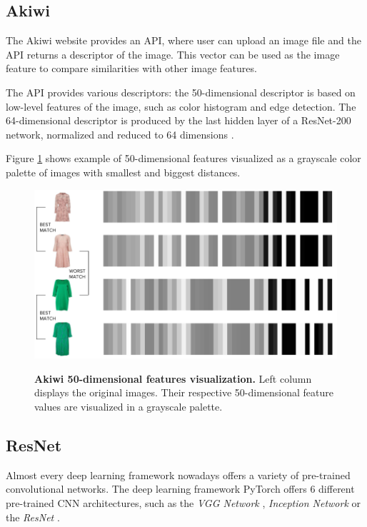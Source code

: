 \documentclass[12pt]{report}
\begin{document}
\subsection{Akiwi}
The Akiwi website \cite{sonnenberg_akiwi_nodate} provides an API, where user can upload an image file and the API returns a descriptor of the image. This vector can be used as the image feature to compare similarities with other image features.

The API provides various descriptors: the 50-dimensional descriptor is based on low-level features of the image, such as color histogram and edge detection. The 64-dimensional descriptor is produced by the last hidden layer of a ResNet-200 network, normalized and reduced to 64 dimensions \cite{Barthel:2017:VBM:3078971.3079016}.

Figure \ref{fig:akiwi50_feats} shows example of 50-dimensional features visualized as a grayscale color palette of images with smallest and biggest distances.

\begin{figure}[h]
\centering
{\includegraphics[width=.8\linewidth]{03_analysis/cbir/akiwi50_feats}}
\caption{\label{fig:akiwi50_feats} \textbf{Akiwi 50-dimensional features visualization.} Left column displays the original images. Their respective 50-dimensional feature values are visualized in a grayscale palette.}
\end{figure}


\subsection{ResNet}
Almost every deep learning framework nowadays offers a variety of pre-trained convolutional networks. The deep learning framework PyTorch offers 6 different pre-trained CNN architectures, such as the \textit{VGG Network} \cite{simonyan_very_2014}, \textit{Inception Network} \cite{szegedy_rethinking_2015} or the \textit{ResNet} \cite{he_deep_2015}. 
\end{document}

